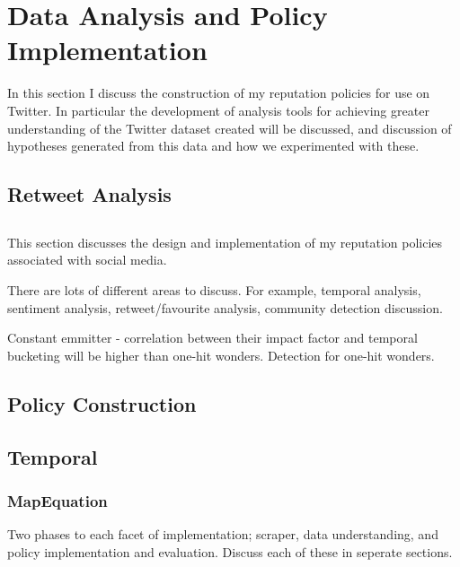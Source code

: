 \chapter{Data Analysis and Policy Implementation}\label{C:us}

In this section I discuss the construction of my reputation policies for use on Twitter. In particular the development of analysis tools for achieving greater understanding of the Twitter dataset created will be discussed, and discussion of hypotheses generated from this data and how we experimented with these. %

\section{Retweet Analysis}


\section{}

This section discusses the design and implementation of my reputation policies associated with social media. 

There are lots of different areas to discuss. For example, temporal analysis, sentiment analysis, retweet/favourite analysis, community detection discussion. 

Constant emmitter - correlation between their impact factor and temporal bucketing will be higher than one-hit wonders. Detection for one-hit wonders. 





\section{Policy Construction}

\section{Temporal}

\subsection{MapEquation}

Two phases to each facet of implementation; scraper, data understanding, and policy implementation and evaluation. Discuss each of these in seperate sections.

